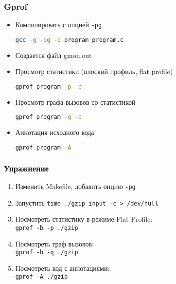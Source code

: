 \begin{frame}[fragile]
 \frametitle{Gprof}
 \begin{itemize}
   \item Компилировать с опцией \texttt{-pg}
\begin{lstlisting}[language=sh]
 gcc -g -pg -o program program.c
\end{lstlisting}
   \item Создается файл gmon.out
   \item Просмотр статистики (плоский профиль, flat profile) 
\begin{lstlisting}[language=sh]
gprof program -p -b
\end{lstlisting}
    \item Просмотр графа вызовов со статистикой
\begin{lstlisting}[language=sh]
gprof program -q -b
\end{lstlisting}
    \item Аннотация исходного кода
\begin{lstlisting}[language=sh]
gprof program -A
\end{lstlisting}
 \end{itemize}
\end{frame}

\begin{frame}
  \frametitle{Упражнение}

  \begin{enumerate}
    \item Изменить Makefile, добавить опцию \texttt{-pg}
    \item Запустить \texttt{time ./gzip input -c > /dev/null}
    \item Посмотреть статистику в режиме Flat Profile:\\
        {\tt gprof -b -p ./gzip }
    \item Посмотреть граф вызовов:\\
        {\tt gprof -b -q ./gzip}
    \item Посмотреть код с аннотациями:\\
        {\tt gprof -A ./gzip}
  \end{enumerate}
\end{frame}

